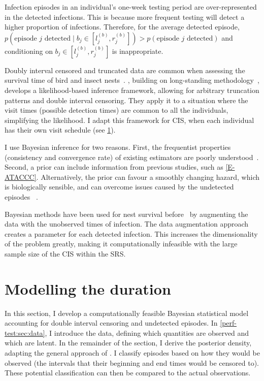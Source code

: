 \documentclass[thesis.tex]{subfiles}
\begin{document}
Infection episodes in an individual's one-week testing period are over-represented in the detected infections.
This is because more frequent testing will detect a higher proportion of infections.
Therefore, for the average detected episode, $p(\text{episode $j$ detected} \mid b_j \in [l_j^{(b)}, r_j^{(b)}]) > p(\text{episode $j$ detected})$ and conditioning on $b_j \in [l_j^{(b)}, r_j^{(b)}]$ is inappropriate.

Doubly interval censored and truncated data are common when assessing the survival time of bird and insect nests~\autocite{heiseyABCs}.
\textcite{heiseyModelling}, building on long-standing methodology~\autocite{dempsterMaximum,turnbullEmpirical}, develops a likelihood-based inference framework, allowing for arbitrary truncation patterns and double interval censoring.
They apply it to a situation where the visit times (possible detection times) are common to all the individuals, simplifying the likelihood.
I adapt this framework for CIS, when each individual has their own visit schedule (see \cref{perf-test:sec:model}).

I use Bayesian inference for two reasons.
First, the frequentist properties (\eg consistency and convergence rate) of existing estimators are poorly understood~\autocite{sunAnalysis,dengNonparametric}.
Second, a prior can include information from previous studies, such as \cref{E-ATACCC}.
Alternatively, the prior can favour a smoothly changing hazard, which is biologically sensible, and can overcome issues caused by the undetected episodes ~\autocite{caoBias}.

Bayesian methods have been used for nest survival before~\autocite{heBayesiana,heBayesian,caoModeling} by augmenting the data with the unobserved times of infection.
The data augmentation approach creates a parameter for each detected infection.
This increases the dimensionality of the problem greatly, making it computationally infeasible with the large sample size of the CIS within the SRS.


\section{Modelling the duration}\label{perf-test:sec:model}

In this section, I develop a computationally feasible Bayesian statistical model accounting for double interval censoring and undetected episodes.
In \cref{perf-test:sec:data}, I introduce the data, defining which quantities are observed and which are latent.
In the remainder of the section, I derive the posterior density, adapting the general approach of \textcite{heiseyModelling}.
I classify episodes based on how they would be observed (\ie the intervals that their beginning and end times would be censored to).
These potential classification can then be compared to the actual observations.
\end{document}
